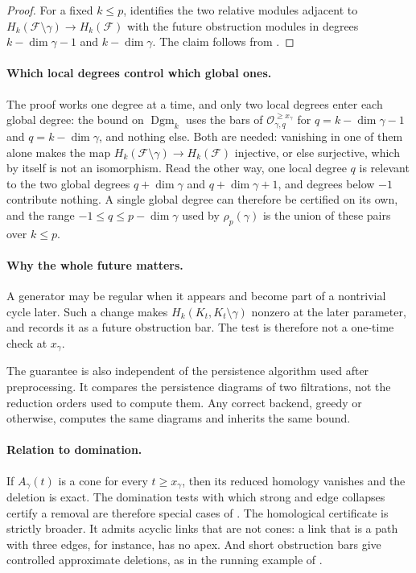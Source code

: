 \documentclass[11pt,letterpaper]{article}
\theoremstyle{definition}
\newcommand{\Dgm}{\operatorname{Dgm}}
\newcommand{\Oc}{\mathcal O}
\begin{document}
\begin{proof}
For a fixed $k\leq p$,  identifies the two relative
modules adjacent to
$H_k(\mathcal F\setminus\gamma)\to H_k(\mathcal F)$ with the future
obstruction modules in degrees $k-\dim\gamma-1$ and
$k-\dim\gamma$. The claim follows from
.
\end{proof}

\paragraph{Which local degrees control which global ones.}
The proof works one degree at a time, and only two local degrees enter each
global degree: the bound on $\Dgm_k$ uses the bars of
$\Oc_{\gamma,q}^{\geq x_\gamma}$ for $q=k-\dim\gamma-1$ and
$q=k-\dim\gamma$, and nothing else. Both are needed: vanishing in one of them alone
makes the map $H_k(\mathcal F\setminus\gamma)\to H_k(\mathcal F)$ injective,
or else surjective, which by itself is not an isomorphism. Read the other way, one local degree $q$
is relevant to the two global degrees $q+\dim\gamma$ and $q+\dim\gamma+1$,
and degrees below $-1$ contribute nothing. A single global degree can
therefore be certified on its own, and the range $-1\leq q\leq p-\dim\gamma$
used by $\rho_p(\gamma)$ is the union of these pairs over $k\leq p$.

\paragraph{Why the whole future matters.}
A generator may be regular when it appears and become part of a nontrivial
cycle later. Such a change makes
$H_k(K_t,K_t\setminus\gamma)$ nonzero at the later parameter, and
 records it as a future obstruction bar. The test is
therefore not a one-time check at $x_\gamma$.

The guarantee is also independent of the persistence algorithm used after
preprocessing. It compares the persistence diagrams of two filtrations, not
the reduction orders used to compute them. Any correct backend, greedy or
otherwise, computes the same diagrams and inherits the same bound.

\paragraph{Relation to domination.}
If $A_\gamma(t)$ is a cone for every $t\geq x_\gamma$, then its reduced
homology vanishes and the deletion is exact. The domination tests with which
strong and edge collapses certify a removal
\cite{BoissonnatPritamPareek2018,BoissonnatPritam2019,BoissonnatPritam2020,GlissePritam2022}
are therefore special cases of . The homological
certificate is strictly broader. It admits acyclic links that are not cones:
a link that is a path with three edges, for instance, has no apex. And short
obstruction bars give controlled approximate deletions, as in the running
example of .
\end{document}
